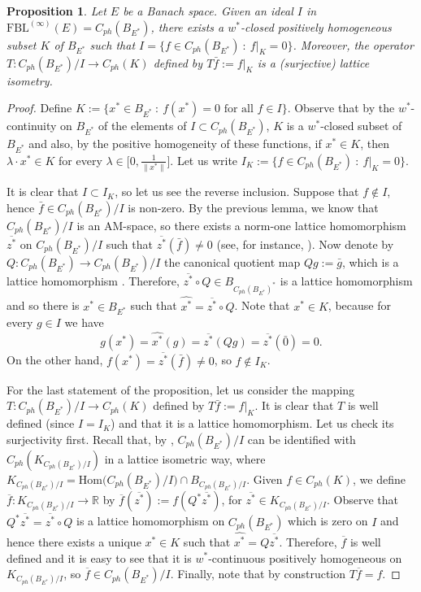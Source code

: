 \documentclass[11pt]{amsart}
\newtheorem{prop}[thm]{Proposition}
\theoremstyle{definition}
\numberwithin{equation}{section}
\newcommand{\fbl}{\text{FBL}}
\begin{document}
\begin{prop}\label{prop:ideals-free-infinity}
Let $E$ be a Banach space. Given an ideal $I$ in $\fbl^{(\infty)}(E)=C_{ph}(B_{E^*})$, there exists a $w^*$-closed positively homogeneous subset $K$ of $B_{E^*}$ such that $I=\{f\in C_{ph}(B_{E^*})\::\: \left.f\right|_{K}=0\}$. Moreover, the operator $T:C_{ph}(B_{E^*})/I\to C_{ph}(K)$ defined by $T\bar{f}:=\left.f\right|_K$ is a (surjective) lattice isometry.
\end{prop}
\begin{proof}
Define $K:=\{x^*\in B_{E^*}\::\: f(x^*)=0 \text{ for all } f\in I\}$. Observe that by the $w^*$-continuity on $B_{E^*}$ of the elements of $I\subset C_{ph}(B_{E^*})$, $K$ is a $w^*$-closed subset of $B_{E^*}$ and also, by the positive homogeneity of these functions, if $x^*\in K$, then $\lambda\cdot x^*\in K$ for every $\lambda\in \bigl[0,\frac{1}{\|x^*\|}\bigr]$. Let us write $I_K:=\{f\in C_{ph}(B_{E^*})\::\: \left.f\right|_{K}=0\}$.

It is clear that $I\subset I_{K}$, so let us see the reverse inclusion. Suppose that $f\notin I$, hence $\bar{f}\in C_{ph}(B_{E^*})/I$ is non-zero. By the previous lemma, we know that $C_{ph}(B_{E^*})/I$ is an AM-space, so there exists a norm-one lattice homomorphism $\overline{z^*}$ on $C_{ph}(B_{E^*})/I$ such that $\overline{z^*}(\bar{f})\neq 0$ (see, for instance, \cite[Proposition 5.4]{BGHMT}). Now denote by $Q:C_{ph}(B_{E^*})\to C_{ph}(B_{E^*})/I$ the canonical quotient map $Qg:=\bar{g}$, which is a lattice homomorphism \cite[Proposition 1.3.13]{M-N-book}. Therefore, $\overline{z^*}\circ Q\in B_{C_{ph}(B_{E^*})^*}$ is a lattice homomorphism and so there is $x^*\in B_{E^*}$ such that $\widehat{x^*}=\overline{z^*}\circ Q$. Note that $x^*\in K$, because for every $g\in I$ we have
$$
g(x^*)=\widehat{x^*}(g)=\overline{z^*}(Qg)=\overline{z^*}(\bar{0})=0.
$$
On the other hand, $f(x^*)=\overline{z^*}(\bar{f})\neq 0$, so $f\notin I_K$.

For the last statement of the proposition, let us consider the mapping $T:C_{ph}(B_{E^*})/I\to C_{ph}(K)$ defined by $T\bar{f}:=\left.f\right|_K$. It is clear that $T$ is well defined (since $I=I_K$) and that it is a lattice homomorphism. Let us check its surjectivity first. Recall that, by \cite[Proposition 5.4]{BGHMT}, $C_{ph}(B_{E^*})/I$ can be identified with $C_{ph}\left(K_{C_{ph}(B_{E^*})/I}\right)$ in a lattice isometric way, where $K_{C_{ph}(B_{E^*})/I}=\text{Hom}\bigl(C_{ph}(B_{E^*})/I\bigr)\cap B_{C_{ph}(B_{E^*})/I}$. Given $f\in C_{ph}(K)$, we define $\overline{f}:K_{C_{ph}(B_{E^*})/I}\to\mathbb{R}$ by $\overline{f}(\overline{z^*}):=f(Q^*\overline{z^*})$, for $\overline{z^*}\in K_{C_{ph}(B_{E^*})/I}$. Observe that $Q^*\overline{z^*}=\overline{z^*}\circ Q$ is a lattice homomorphism on $C_{ph}(B_{E^*})$ which is zero on $I$ and hence there exists a unique $x^*\in K$ such that $\widehat{x^*}=Q\overline{z^*}$. Therefore, $\overline{f}$ is well defined and it is easy to see that it is $w^*$-continuous positively homogeneous on $K_{C_{ph}(B_{E^*})/I}$, so $\overline{f}\in C_{ph}(B_{E^*})/I$. Finally, note that by construction $T\overline{f}=f$.



\end{proof}
\end{document}
